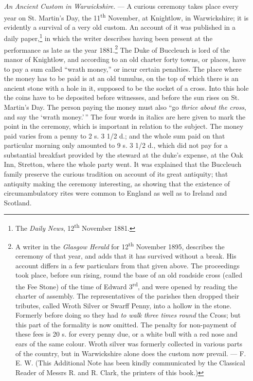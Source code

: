 \documentclass[a4paper, 11pt, oneside, polutonikogreek, english]{article}
\begin{document}
\emph{An Ancient Custom in Warwickshire.} --- A curious ceremony takes place every year on St. Martin's Day, the 11\textsuperscript{th} November, at Knightlow, in Warwickshire; it is evidently a survival of a very old custom. An account of it was published in a daily paper,\footnote{The \emph{Daily News}, 12\textsuperscript{th} November 1881.} in which the writer describes having been present at the performance as late as the year 1881.\footnote{A writer in the \emph{Glasgow Herald} for 12\textsuperscript{th} November 1895, describes the ceremony of that year, and adds that it has survived without a break. His account differs in a few particulars from that given above. The proceedings took place, before sun rising, round the base of an old roadside cross (called the Fee Stone) of the time of Edward 3\textsuperscript{rd}, and were opened by reading the charter of assembly. The representatives of the parishes then dropped their tributes, called Wroth Silver or Swarff Penny, into a hollow in  the stone. Formerly before doing so they had \emph{to walk three times round} the  Cross; but this part of the formality is now omitted. The penalty for non-payment of these fees is 20 s. for every penny due, or a white bull with a red nose and ears of the same colour. Wroth silver was formerly collected in various parts of the country, but in Warwickshire alone does the custom now prevail. --- F. E. W. (This Additional Note has been kindly communicated by the Classical Reader of Messrs R. and R. Clark, the printers of this book.)} The Duke of Buccleuch is lord of the manor of Knightlow, and according to an old charter forty towns, or places, have to pay a sum called ``wrath money,'' or incur certain penalties. The place where the money has to be paid is at an old tumulus, on the top of which there is an ancient stone with a hole in it, supposed to be the socket of a cross. Into this hole the coins have to be deposited before witnesses, and before the sun rises on St. Martin's Day. The person paying the money must also ``go \emph{thrice about the cross}, and say the `wrath money.'\,'' The four words in italics are here given to mark the point in the ceremony, which is important in relation to the subject. The money paid varies from a penny to 2 s. 3 1/2 d.; and the whole sum paid on that particular morning only amounted to 9 s. 3 1/2 d., which did not pay for a substantial breakfast provided by the steward at the duke's expense, at the Oak Inn, Stretton, where the whole party went. It was explained that the Buccleuch family preserve the curious tradition on account of its great antiquity; that antiquity making the ceremony interesting, as showing that the existence of circumambulatory rites were common to England as well as to Ireland and Scotland.
\end{document}
